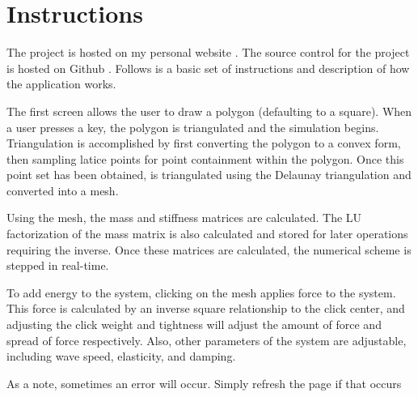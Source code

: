 \section{Instructions}
The project is hosted on my personal website \cite{hosted_site}. The source control for the project is hosted on Github
\cite{github}. Follows is a basic set of instructions and description of how the application works.

The first screen allows the user to draw a polygon (defaulting to a square). When a user presses a key, the polygon is
triangulated and the simulation begins. Triangulation is accomplished by first converting the polygon to a convex form,
then sampling latice points for point containment within the polygon. Once this point set has been obtained, is
triangulated using the Delaunay triangulation and converted into a mesh.

Using the mesh, the mass and stiffness matrices are calculated. The LU factorization of the mass matrix is also
calculated and stored for later operations requiring the inverse. Once these matrices are calculated, the numerical
scheme is stepped in real-time.

To add energy to the system, clicking on the mesh applies force to the system. This force is calculated by an inverse
square relationship to the click center, and adjusting the click weight and tightness will adjust the amount of force
and spread of force respectively. Also, other parameters of the system are adjustable, including wave speed,
elasticity, and damping.

As a note, sometimes an error will occur. Simply refresh the page if that occurs

